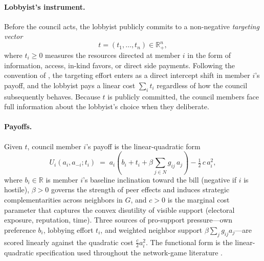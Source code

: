 \documentclass[11pt,letterpaper]{article}
\theoremstyle{plain}
\theoremstyle{definition}
\theoremstyle{remark}
\begin{document}
\paragraph{Lobbyist's instrument.} Before the council acts, the lobbyist publicly commits to a non-negative \emph{targeting vector}
\[
t = (t_1, \ldots, t_n) \in \mathbb{R}^n_+,
\]
where $t_i \geq 0$ measures the resources directed at member $i$ in the form of information, access, in-kind favors, or direct side payments. Following the convention of \citet{ggg2020}, the targeting effort enters as a direct intercept shift in member $i$'s payoff, and the lobbyist pays a linear cost $\sum_i t_i$ regardless of how the council subsequently behaves. Because $t$ is publicly committed, the council members face full information about the lobbyist's choice when they deliberate.

\paragraph{Payoffs.} Given $t$, council member $i$'s payoff is the linear-quadratic form
\begin{equation}
U_i(a_i, a_{-i}; t_i) \;=\; a_i \!\left( b_i + t_i + \beta \sum_{j \in N} g_{ij}\, a_j \right) - \tfrac{1}{2}\, c\, a_i^2,
\label{eq:payoff}
\end{equation}
where $b_i \in \mathbb{R}$ is member $i$'s baseline inclination toward the bill (negative if $i$ is hostile), $\beta > 0$ governs the strength of peer effects and induces strategic complementarities across neighbors in $G$, and $c > 0$ is the marginal cost parameter that captures the convex disutility of visible support (electoral exposure, reputation, time). Three sources of pro-support pressure---own preference $b_i$, lobbying effort $t_i$, and weighted neighbor support $\beta \sum_j g_{ij} a_j$---are scored linearly against the quadratic cost $\tfrac{c}{2} a_i^2$. The functional form is the linear-quadratic specification used throughout the network-game literature \citep{bcz2006, ggg2020}.
\end{document}

